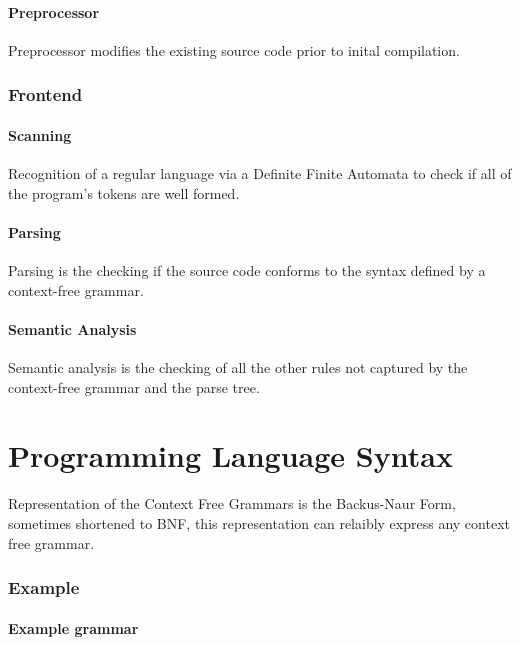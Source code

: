 \documentclass[11pt]{book}
\begin{document}
\subsubsection{Preprocessor}
Preprocessor modifies the existing source code prior to inital compilation.
\subsection{Frontend}
\subsubsection{Scanning}

Recognition of a regular language via a Definite Finite Automata to check if all of the program's tokens are well formed.

\subsubsection{Parsing}
Parsing is the checking if the source code conforms to the syntax defined by a context-free grammar.

\subsubsection{Semantic Analysis}
Semantic analysis is the checking of all the other rules not captured by the context-free grammar and the parse tree.

\chapter{Programming Language Syntax}

{\center Representation of the Context Free Grammars is the Backus-Naur Form, sometimes shortened to BNF, this representation can relaibly express any context free grammar.}

\subsection{Example}

\subsubsection{Example grammar}
\end{document}
